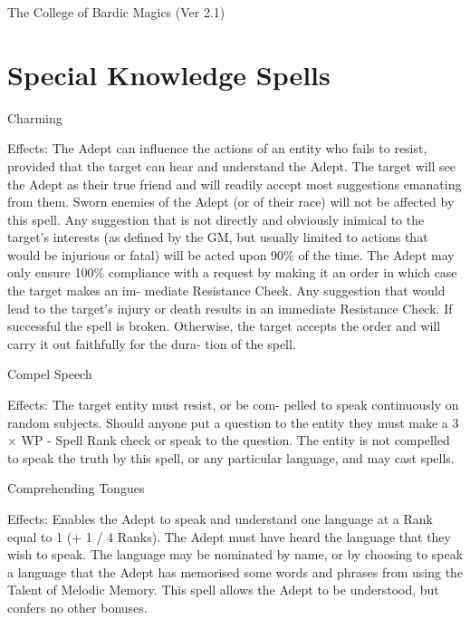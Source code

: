 \begin{Chapter}{The College of Bardic Magics (Ver 2.1)}
\section{Special Knowledge Spells}

\begin{spell}[S-1]{Charming }

Effects: The  Adept can influence the actions of an 
entity  who  fails  to  resist,  provided  that  the  target 
can hear and understand the Adept. The target will 
see  the  Adept  as  their  true  friend  and  will  readily 
accept  most  suggestions  emanating  from  them. 
Sworn enemies of the Adept (or of their race) will 
not be affected by this spell. Any suggestion that is 
not  directly  and  obviously  inimical  to  the  target’s 
interests (as defined by the GM, but usually limited 
to  actions that  would  be  injurious  or  fatal)  will  be 
acted upon  90\%  of  the  time.  The  Adept  may  only 
ensure 100\% compliance with a request by making 
it  an  order  in  which  case  the  target  makes  an  im-
mediate  Resistance  Check.  Any  suggestion  that 
would lead to the target’s injury or death results in 
an  immediate  Resistance  Check.  If  successful  the 
spell  is  broken.  Otherwise,  the  target  accepts  the 
order  and  will  carry  it  out  faithfully  for  the  dura-
tion of the spell. 
\end{spell}

\begin{spell}[S-2]{Compel Speech }

Effects:  The  target  entity  must  resist,  or  be  com-
pelled  to  speak  continuously  on  random  subjects. 
Should  anyone  put  a  question  to  the  entity  they 
must make a 3 × WP  - Spell Rank check or speak 
to  the  question.  The  entity  is  not  compelled  to 
speak the truth by this spell, or any  particular language, and may cast spells. 
\end{spell}

\begin{spell}[S-3]{Comprehending Tongues }

Effects: Enables the Adept to speak and understand 
one language at a Rank equal to 1 (+ 1 / 4 Ranks). 
The Adept must have heard the language that they 
wish to speak. The language may be nominated by 
name, or by choosing to speak a language that the 
Adept  has  memorised  some  words  and  phrases 
from  using  the  Talent  of  Melodic  Memory.  This 
spell  allows  the  Adept  to  be  understood,  but  confers no other bonuses. 
\end{spell}


\end{Chapter}

